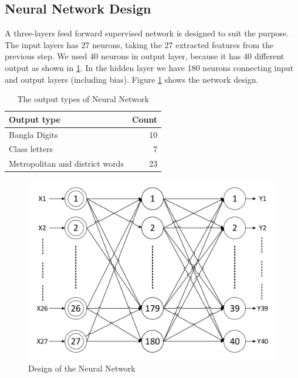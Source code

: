 \documentclass{standalone}
\begin{document}
\subsection{Neural Network Design}
A three-layers feed forward supervised network is designed to suit the purpose. The input layers has 27 neurons, taking the 27 extracted features from the previous step. We used 40 neurons in output layer, because it has 40 different output as shown in \ref{table:OutputTypes}. In the hidden layer we have 180 neurons connecting input and output layers (including bias). Figure \ref{fig:PerceptronModel} shows the network design.

\begin{table}[hb]
\centering
\begin{tabular}{|l|r|}
\hline
Output type & Count  \\
\hline
Bangla Digits   & 10 \\
Class letters   & 7  \\
Metropolitan and district words  & 23 \\
\hline
\end{tabular}
\caption{The output types of Neural Network}
\label{table:OutputTypes}
\end{table}

\begin{figure}[hb]
     \centering
     \includegraphics[width=1.0\linewidth]{./img/plots/neural}
     \caption{Design of the Neural Network}
     \label{fig:PerceptronModel}
\end{figure}
\end{document}
